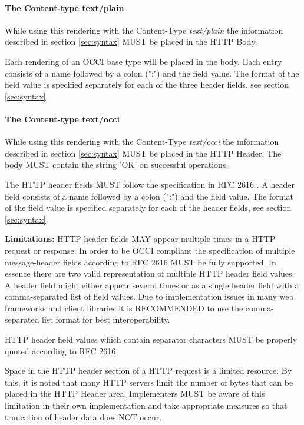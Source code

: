 \documentclass[10pt,a4paper]{article}
\begin{document}
\paragraph{The Content-type text/plain}
While using this rendering with the Content-Type \textit{text/plain}
the information described in section \ref{sec:syntax} MUST be placed
in the HTTP Body.

Each rendering of an OCCI base type will be placed in the body. Each
entry consists of a name followed by a colon (":") and the field
value. The format of the field value is specified separately for each
of the three header fields, see section \ref{sec:syntax}.

\paragraph{The Content-type text/occi}
While using this rendering with the Content-Type \textit{text/occi}
the information described in section \ref{sec:syntax} MUST be placed
in the HTTP Header. The body MUST contain the string 'OK' on
successful operations.

The HTTP header fields MUST follow the specification in RFC 2616
\cite{rfc2616}. A header field consists of a name followed by a colon
(":") and the field value. The format of the field value is specified
separately for each of the header fields, see section
\ref{sec:syntax}.

\textbf{Limitations: } HTTP header fields MAY appear multiple times in
a HTTP request or response. In order to be OCCI compliant the
specification of multiple message-header fields according to RFC 2616
MUST be fully supported. In essence there are two valid representation
of multiple HTTP header field values. A header field might either
appear several times or as a single header field with a
comma-separated list of field values. Due to implementation issues in
many web frameworks and client libraries it is RECOMMENDED to use the
comma-separated list format for best interoperability.

HTTP header field values which contain separator characters MUST be
properly quoted according to RFC 2616.

Space in the HTTP header section of a HTTP request is a limited
resource. By this, it is noted that many HTTP servers limit the number
of bytes that can be placed in the HTTP Header area. Implementers MUST
be aware of this limitation in their own implementation and take
appropriate measures so that truncation of header data does NOT
occur.
\end{document}
